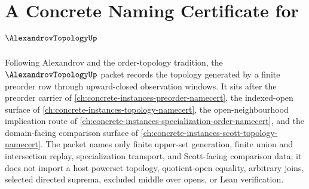 \chapter{A Concrete Naming Certificate for $\AlexandrovTopologyUp$}
\label{ch:concrete-instances-alexandrov-topology-namecert}

Following Alexandrov and the order-topology tradition, the $\AlexandrovTopologyUp$ packet records the topology generated by a finite preorder row through upward-closed observation windows. It sits after the preorder carrier of \autoref{ch:concrete-instances-preorder-namecert}, the indexed-open surface of \autoref{ch:concrete-instances-topology-namecert}, the open-neighbourhood implication route of \autoref{ch:concrete-instances-specialization-order-namecert}, and the domain-facing comparison surface of \autoref{ch:concrete-instances-scott-topology-namecert}. The packet names only finite upper-set generation, finite union and intersection replay, specialization transport, and Scott-facing comparison data; it does not import a host powerset topology, quotient-open equality, arbitrary joins, selected directed suprema, excluded middle over opens, or Lean verification.

